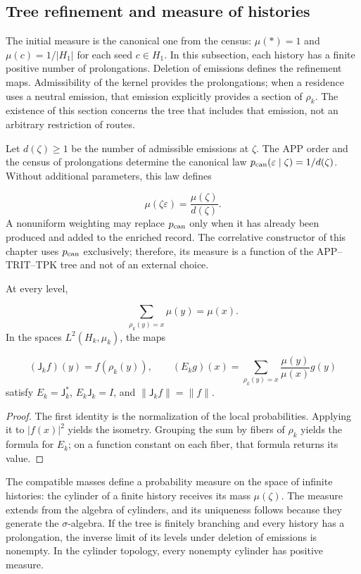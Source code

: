 \subsection{Tree refinement and measure of histories}
The initial measure is the canonical one from the census: \(\mu(\ast)=1\) and
\(\mu(c)=1/|H_1|\) for each seed \(c\in H_1\). In this subsection, each
history has a finite positive number of prolongations. Deletion of
emissions defines the refinement maps. Admissibility of the kernel
provides the prolongations; when a residence uses a neutral emission,
that emission explicitly provides a section of \(\rho_k\). The existence of this
section concerns the tree that includes that emission, not an arbitrary
restriction of routes.

Let \(d(\zeta)\geq1\) be the number of admissible emissions at \(\zeta\). The
APP order and the census of prolongations determine the canonical law
\(p_{\rm can}(\varepsilon\mid\zeta)=1/d(\zeta)\). Without additional
parameters, this law defines

\[
\mu(\zeta\varepsilon)=\frac{\mu(\zeta)}{d(\zeta)}.
\]
A nonuniform weighting may replace \(p_{\rm can}\) only when it has already
been produced and added to the enriched record. The correlative constructor
of this chapter uses \(p_{\rm can}\) exclusively; therefore, its measure
is a function of the APP--TRIT--TPK tree and not of an external choice.

\begin{proposition}
\label{act21:prop:continuo-esperanza-condicional}
At every level,

\[
\sum_{\rho_k(y)=x}\mu(y)=\mu(x).
\]
In the spaces \(L^2(H_k,\mu_k)\), the maps

\[
(\mathsf J_kf)(y)=f(\rho_k(y)),
\qquad
(E_kg)(x)=\sum_{\rho_k(y)=x}\frac{\mu(y)}{\mu(x)}g(y)
\]
satisfy \(E_k=\mathsf J_k^*\), \(E_k\mathsf J_k=I\), and \(\|\mathsf J_kf\|=\|f\|\).
\end{proposition}
\begin{proof}
The first identity is the normalization of the local probabilities. Applying it to \(|f(x)|^2\) yields the isometry. Grouping the sum by fibers of \(\rho_k\) yields the formula for \(E_k\); on a function constant on each fiber, that formula returns its value.
\end{proof}

The compatible masses define a probability measure on the space of infinite histories: the cylinder of a finite history receives its mass \(\mu(\zeta)\). The measure extends from the algebra of cylinders, and its uniqueness follows because they generate the \(\sigma\)-algebra. If the tree is finitely branching and every history has a prolongation, the inverse limit of its levels under deletion of emissions is nonempty. In the cylinder topology, every nonempty cylinder has positive measure.

